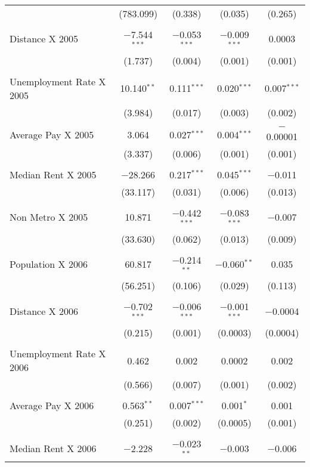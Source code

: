 \documentclass[]{article}
\begin{document}
\begin{table}[!htbp]
\begin{tabular}{@{\extracolsep{5pt}}lcccc}
  & (783.099) & (0.338) & (0.035) & (0.265) \\ 
  & & & & \\ 
 Distance X 2005 & $-$7.544$^{***}$ & $-$0.053$^{***}$ & $-$0.009$^{***}$ & 0.0003 \\ 
  & (1.737) & (0.004) & (0.001) & (0.001) \\ 
  & & & & \\ 
 Unemployment Rate X 2005  & 10.140$^{**}$ & 0.111$^{***}$ & 0.020$^{***}$ & 0.007$^{***}$ \\ 
  & (3.984) & (0.017) & (0.003) & (0.002) \\ 
  & & & & \\ 
 Average Pay X 2005 & 3.064 & 0.027$^{***}$ & 0.004$^{***}$ & $-$0.00001 \\ 
  & (3.337) & (0.006) & (0.001) & (0.001) \\ 
  & & & & \\ 
 Median Rent X 2005 & $-$28.266 & 0.217$^{***}$ & 0.045$^{***}$ & $-$0.011 \\ 
  & (33.117) & (0.031) & (0.006) & (0.013) \\ 
  & & & & \\ 
 Non Metro X 2005 & 10.871 & $-$0.442$^{***}$ & $-$0.083$^{***}$ & $-$0.007 \\ 
  & (33.630) & (0.062) & (0.013) & (0.009) \\ 
  & & & & \\ 
 Population X 2006 & 60.817 & $-$0.214$^{**}$ & $-$0.060$^{**}$ & 0.035 \\ 
  & (56.251) & (0.106) & (0.029) & (0.113) \\ 
  & & & & \\ 
 Distance X 2006 & $-$0.702$^{***}$ & $-$0.006$^{***}$ & $-$0.001$^{***}$ & $-$0.0004 \\ 
  & (0.215) & (0.001) & (0.0003) & (0.0004) \\ 
  & & & & \\ 
 Unemployment Rate X 2006  & 0.462 & 0.002 & 0.0002 & 0.002 \\ 
  & (0.566) & (0.007) & (0.001) & (0.002) \\ 
  & & & & \\ 
 Average Pay X 2006 & 0.563$^{**}$ & 0.007$^{***}$ & 0.001$^{*}$ & 0.001 \\ 
  & (0.251) & (0.002) & (0.0005) & (0.001) \\ 
  & & & & \\ 
 Median Rent X 2006 & $-$2.228 & $-$0.023$^{**}$ & $-$0.003 & $-$0.006 \\ 

\end{tabular}
\end{table}
\end{document}
